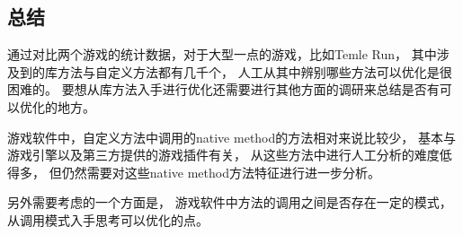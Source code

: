 \subsection{总结}
\label{sec:dexanalysis:conclusion}
通过对比两个游戏的统计数据，对于大型一点的游戏，比如Temle Run，
其中涉及到的库方法与自定义方法都有几千个，
人工从其中辨别哪些方法可以优化是很困难的。
要想从库方法入手进行优化还需要进行其他方面的调研来总结是否有可以优化的地方。

游戏软件中，自定义方法中调用的native method的方法相对来说比较少，
基本与游戏引擎以及第三方提供的游戏插件有关，
从这些方法中进行人工分析的难度低得多，
但仍然需要对这些native method方法特征进行进一步分析。

另外需要考虑的一个方面是，
游戏软件中方法的调用之间是否存在一定的模式，
从调用模式入手思考可以优化的点。


